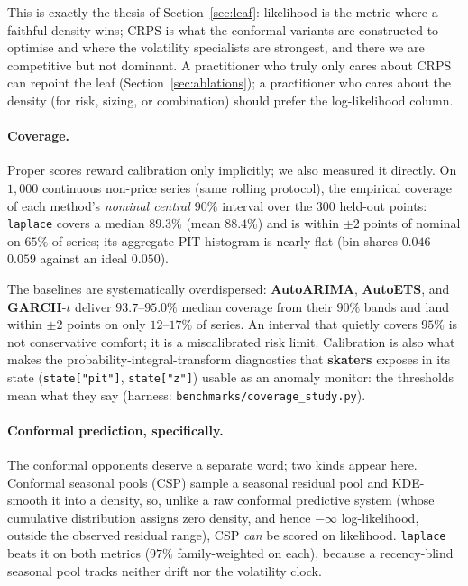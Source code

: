 \documentclass[article]{jss}
\providecommand{\pkg}[1]{\textbf{#1}}
\providecommand{\code}[1]{\texttt{#1}}
\begin{document}
This is
exactly the thesis of Section~\ref{sec:leaf}: likelihood is the metric where a
faithful density wins; CRPS is what the conformal variants are constructed to
optimise and where the volatility specialists are strongest, and there we are
competitive but not dominant. A practitioner who truly only cares about CRPS
can repoint the leaf (Section~\ref{sec:ablations}); a practitioner who cares about
the density (for risk, sizing, or combination) should prefer the
log-likelihood column.

\paragraph{Coverage.}
Proper scores reward calibration only implicitly; we also measured it directly.
On $1{,}000$ continuous non-price series (same rolling protocol), the empirical
coverage of each method's \emph{nominal central $90\%$} interval over the
$300$ held-out points: \code{laplace} covers a median $89.3\%$ (mean $88.4\%$)
and is within $\pm2$ points of nominal on $65\%$ of series; its aggregate
PIT histogram is nearly flat (bin shares $0.046$--$0.059$ against an ideal
$0.050$).

The baselines are systematically overdispersed: \pkg{AutoARIMA},
\pkg{AutoETS}, and \pkg{GARCH}-$t$ deliver $93.7$--$95.0\%$ median coverage
from their $90\%$ bands and land within $\pm2$ points on only $12$--$17\%$ of
series. An interval that quietly covers $95\%$ is not conservative comfort; it
is a miscalibrated risk limit. Calibration is also what makes the
probability-integral-transform diagnostics that \pkg{skaters} exposes in its
state (\code{state["pit"]}, \code{state["z"]}) usable as an anomaly monitor:
the thresholds mean what they say
(harness: \code{benchmarks/coverage\_study.py}).

\paragraph{Conformal prediction, specifically.}
The conformal opponents deserve a separate word; two kinds appear here. Conformal
seasonal pools (CSP) sample a seasonal residual pool and KDE-smooth it into a
density, so, unlike a raw conformal predictive system (whose cumulative
distribution assigns zero density, and hence $-\infty$ log-likelihood, outside the
observed residual range), CSP \emph{can} be scored on likelihood. \code{laplace}
beats it on both metrics ($97\%$ family-weighted on each), because a recency-blind
seasonal pool tracks neither drift nor the volatility clock.
\end{document}
